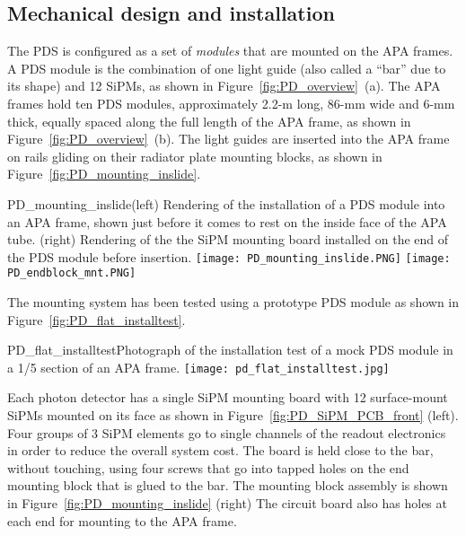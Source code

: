 \subsection{Mechanical design and installation}

The PDS is configured as a set of \textit{modules} that are mounted on the APA frames.  A PDS module is
the combination of one light guide (also called a ``bar'' due to its
shape) and 12 SiPMs, as shown in Figure~\ref{fig:PD_overview}~(a). 
The APA frames hold ten PDS modules, approximately 2.2-m long,
86-mm wide and 6-mm thick, equally spaced along the full length of the
APA frame, as shown in Figure~\ref{fig:PD_overview}~(b). 
The light guides are inserted into the APA frame on rails gliding on their radiator
plate mounting blocks, as shown in Figure~\ref{fig:PD_mounting_inslide}. 

\begin{cdrfigure}
  {PD_mounting_inslide}{(left) Rendering of the installation of a PDS module
    into an APA frame, shown just before it comes to rest on the inside face
    of the APA tube. (right) Rendering of the the SiPM mounting board
    installed on the end of the PDS module before insertion.}
\texttt{[image: PD\_mounting\_inslide.PNG]}
\texttt{[image: PD\_endblock\_mnt.PNG]}
\end{cdrfigure}

The mounting system has been tested using a prototype PDS module  
as shown in Figure~\ref{fig:PD_flat_installtest}.
\begin{cdrfigure}
  {PD_flat_installtest}{Photograph of the installation
    test of a mock PDS module in a 1/5 section of an APA frame.}
\texttt{[image: pd\_flat\_installtest.jpg]}
\end{cdrfigure}


Each photon detector has a single SiPM mounting board with 12 surface-mount SiPMs 
mounted on its face as shown in Figure~\ref{fig:PD_SiPM_PCB_front} (left).
Four groups of $3$ SiPM elements go to single 
channels of the readout electronics in order to reduce the overall system cost.
The board is held close to the bar, without touching, using four screws that go into 
tapped holes on the end mounting block that is glued to the bar.  
The mounting block assembly is shown in Figure~\ref{fig:PD_mounting_inslide} (right) %
The circuit board also has holes at each end for mounting to the APA frame.  

